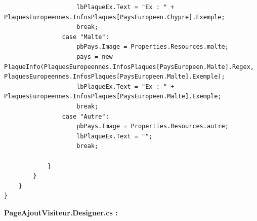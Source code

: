 \documentclass[main.tex]{subfiles}
\begin{document}
\begin{lstlisting}
                    lbPlaqueEx.Text = "Ex : " + PlaquesEuropeennes.InfosPlaques[PaysEuropeen.Chypre].Exemple;
                    break;
                case "Malte":
                    pbPays.Image = Properties.Resources.malte;
                    pays = new PlaqueInfo(PlaquesEuropeennes.InfosPlaques[PaysEuropeen.Malte].Regex, PlaquesEuropeennes.InfosPlaques[PaysEuropeen.Malte].Exemple);
                    lbPlaqueEx.Text = "Ex : " + PlaquesEuropeennes.InfosPlaques[PaysEuropeen.Malte].Exemple;
                    break;
                case "Autre":
                    pbPays.Image = Properties.Resources.autre;
                    lbPlaqueEx.Text = "";
                    break;

            }
        }
    }
}
\end{lstlisting}

\textbf{PageAjoutVisiteur.Designer.cs :}
\end{document}
